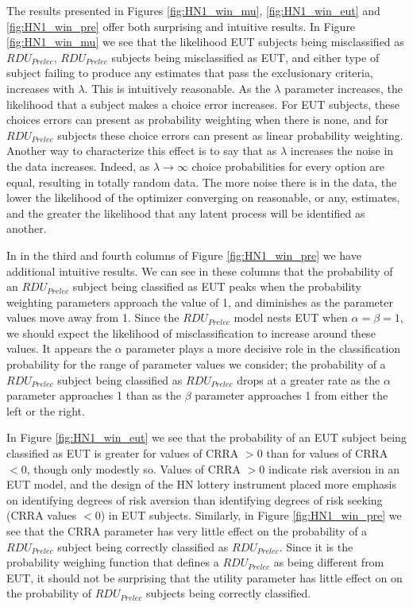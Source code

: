 \documentclass[../main.tex]{subfiles}
\begin{document}
The results presented in Figures \ref{fig:HN1_win_mu}, \ref{fig:HN1_win_eut} and \ref{fig:HN1_win_pre} offer both surprising and intuitive results.
In Figure \ref{fig:HN1_win_mu} we see that the likelihood EUT subjects being misclassified as $\mathit{RDU_{Prelec}}$, $\mathit{RDU_{Prelec}}$ subjects being misclassified as EUT, and either type of subject failing to produce any estimates that pass the exclusionary criteria, increases with $\lambda$.
This is intuitively reasonable.
As the $\lambda$ parameter increases, the likelihood that a subject makes a choice error increases.
For EUT subjects, these choices errors can present as probability weighting when there is none, and for $\mathit{RDU_{Prelec}}$ subjects these choice errors can present as linear probability weighting.
Another way to characterize this effect is to say that as $\lambda$ increases the noise in the data increases.
Indeed, as $\lambda \to \infty$ choice probabilities for every option are equal, resulting in totally random data.
The more noise there is in the data, the lower the likelihood of the optimizer converging on reasonable, or any, estimates, and the greater the likelihood that any latent process will be identified as another.

In in the third and fourth columns of Figure \ref{fig:HN1_win_pre} we have additional intuitive results.
We can see in these columns that the probability of an $\mathit{RDU_{Prelec}}$ subject being classified as EUT peaks when the probability weighting parameters approach the value of 1, and diminishes as the parameter values move away from 1.
Since the $\mathit{RDU_{Prelec}}$ model nests EUT when $\alpha = \beta = 1$, we should expect the likelihood of misclassification to increase around these values.
It appears the $\alpha$ parameter plays a more decisive role in the classification probability for the range of parameter values we consider; the probability of a $\mathit{RDU_{Prelec}}$ subject being classified as $\mathit{RDU_{Prelec}}$ drops at a greater rate as the $\alpha$ parameter approaches 1 than as the $\beta$ parameter approaches 1 from either the left or the right.

In Figure \ref{fig:HN1_win_eut} we see that the probability of an EUT subject being classified as EUT is greater for values of CRRA $> 0$ than for values of CRRA $< 0$, though only modestly so.
Values of CRRA $> 0$ indicate risk aversion in an EUT model, and the design of the HN lottery instrument placed more emphasis on identifying degrees of risk aversion than identifying degrees of risk seeking (CRRA values $ < 0$) in EUT subjects.
Similarly, in Figure \ref{fig:HN1_win_pre} we see that the CRRA parameter has very little effect on the probability of a $\mathit{RDU_{Prelec}}$ subject being correctly classified as $\mathit{RDU_{Prelec}}$.
Since it is the probability weighing function that defines a $\mathit{RDU_{Prelec}}$ as being different from EUT, it should not be surprising that the utility parameter has little effect on on the probability of $\mathit{RDU_{Prelec}}$ subjects being correctly classified.
\end{document}
